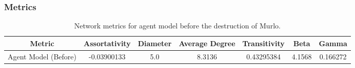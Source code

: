 \documentclass[12pt,a4paper]{thesis}
\begin{document}
\subsubsection{Metrics}


\begin{table}[H]
\centering
\caption{Network metrics for agent model before the destruction of Murlo.}
\tiny
\begin{tabular}{|c|c|c|c|c|c|c|}
\hline Metric & Assortativity & Diameter & Average Degree & Transitivity & Beta & Gamma \\ 
\hline Agent Model (Before) & -0.03900133 & 5.0	& 8.3136 & 0.43295384 & 4.1568	& 0.166272 \\ 
\hline 
\end{tabular} 
\label{tab:agentNetBefore}
\end{table}
\end{document}
